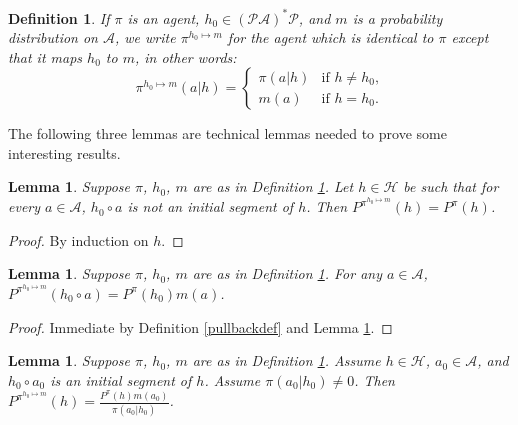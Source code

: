 \documentclass[twoside]{article}
\newtheorem{definition}[theorem]{Definition}
\newtheorem{lemma}[theorem]{Lemma}
\begin{document}
\begin{definition}
\label{modifyagentatoneplace}
    If $\pi$ is an agent, $h_0\in(\mathcal P\mathcal A)^*\mathcal P$,
    and $m$ is a probability distribution on $\mathcal A$,
    we write $\pi^{h_0\mapsto m}$ for the agent which is identical to $\pi$
    except that it maps $h_0$ to $m$, in other words:
    \[
        \pi^{h_0\mapsto m}(a|h)
        =
        \begin{cases}
            \pi(a|h) &\mbox{if $h\not=h_0$,}\\
            m(a) &\mbox{if $h=h_0$.}
        \end{cases}
    \]
\end{definition}

The following three lemmas are technical lemmas needed to prove
some interesting results.

\begin{lemma}
\label{firsttechlemmaforgenericity}
    Suppose $\pi$, $h_0$, $m$ are as in Definition \ref{modifyagentatoneplace}.
    Let $h\in\mathcal H$ be such that
    for every $a\in\mathcal A$,
    $h_0\circ a$ is not an initial segment of $h$.
    Then $P^{\pi^{h_0\mapsto m}}(h)=P^\pi(h)$.
\end{lemma}

\begin{proof}
    By induction on $h$.
\end{proof}

\begin{lemma}
\label{thirdtechlemmaforgenericity}
    Suppose $\pi$, $h_0$, $m$ are as in Definition \ref{modifyagentatoneplace}.
    For any $a\in\mathcal A$,
    $P^{\pi^{h_0\mapsto m}}(h_0\circ a)=P^\pi(h_0)m(a)$.
\end{lemma}

\begin{proof}
    Immediate by Definition \ref{pullbackdef} and Lemma \ref{firsttechlemmaforgenericity}.
\end{proof}

\begin{lemma}
\label{secondtechlemmaforgenericity}
    Suppose $\pi$, $h_0$, $m$ are as in Definition \ref{modifyagentatoneplace}.
    Assume $h\in\mathcal H$, $a_0\in\mathcal A$, and $h_0\circ a_0$ is
    an initial segment of $h$. Assume $\pi(a_0|h_0)\not=0$. Then
    $P^{\pi^{h_0\mapsto m}}(h) = \frac{P^\pi(h)m(a_0)}{\pi(a_0|h_0)}$.
\end{lemma}
\end{document}
